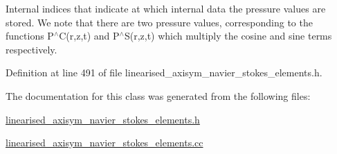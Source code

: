 Internal indices that indicate at which internal data the pressure values are stored. We note that there are two pressure values, corresponding to the functions P$^\wedge$C(r,z,t) and P$^\wedge$S(r,z,t) which multiply the cosine and sine terms respectively. 



Definition at line 491 of file linearised\+\_\+axisym\+\_\+navier\+\_\+stokes\+\_\+elements.\+h.



The documentation for this class was generated from the following files\+:\begin{DoxyCompactItemize}
\item 
\hyperlink{linearised__axisym__navier__stokes__elements_8h}{linearised\+\_\+axisym\+\_\+navier\+\_\+stokes\+\_\+elements.\+h}\item 
\hyperlink{linearised__axisym__navier__stokes__elements_8cc}{linearised\+\_\+axisym\+\_\+navier\+\_\+stokes\+\_\+elements.\+cc}\end{DoxyCompactItemize}
